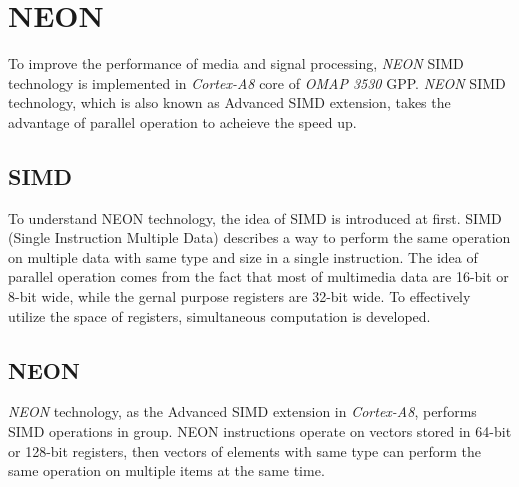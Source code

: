 \section{NEON}
To improve the performance of media and signal processing, \emph{NEON} SIMD technology is implemented in \emph{Cortex-A8} core of \emph{OMAP 3530} GPP. \emph{NEON} SIMD technology, which is also known as Advanced SIMD extension, takes the advantage of parallel operation to acheieve the speed up.
\subsection{SIMD}
To understand NEON technology, the idea of SIMD is introduced at first. 
SIMD (Single Instruction Multiple Data) describes a way to perform the same operation on multiple data with same type and size in a single instruction. The idea of parallel operation comes from the fact that most of multimedia data are 16-bit or 8-bit wide, while the gernal purpose registers are 32-bit wide. To effectively utilize the space of registers, simultaneous computation is developed.  
\subsection{NEON} 
\emph{NEON} technology, as the Advanced SIMD extension in \emph{Cortex-A8}, performs SIMD operations in group. NEON instructions operate on vectors stored in 64-bit or 128-bit registers, then vectors of elements with same type can perform the same operation on multiple items at the same time.

